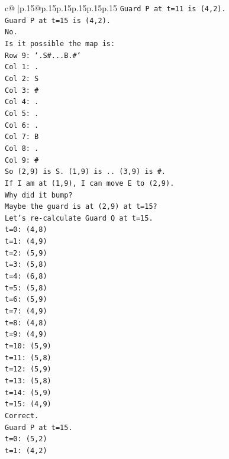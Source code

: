 \documentclass{article}
\begin{document}
{\begin{supertabular}{c@{$\;$}|p{.15\linewidth}@{}p{.15\linewidth}p{.15\linewidth}p{.15\linewidth}p{.15\linewidth}p{.15\linewidth}}
{{{\texttt{Guard P at t=11 is (4,2).} \\
\texttt{Guard P at t=15 is (4,2).} \\
\texttt{No.} \\
\texttt{Is it possible the map is:} \\
\texttt{Row 9: `.S\#...B.\#`} \\
\texttt{Col 1: .} \\
\texttt{Col 2: S} \\
\texttt{Col 3: \#} \\
\texttt{Col 4: .} \\
\texttt{Col 5: .} \\
\texttt{Col 6: .} \\
\texttt{Col 7: B} \\
\texttt{Col 8: .} \\
\texttt{Col 9: \#} \\
\texttt{So (2,9) is S. (1,9) is .. (3,9) is \#.} \\
\texttt{If I am at (1,9), I can move E to (2,9).} \\
\texttt{Why did it bump?} \\
\texttt{Maybe the guard is at (2,9) at t=15?} \\
\texttt{Let's re{-}calculate Guard Q at t=15.} \\
\texttt{t=0: (4,8)} \\
\texttt{t=1: (4,9)} \\
\texttt{t=2: (5,9)} \\
\texttt{t=3: (5,8)} \\
\texttt{t=4: (6,8)} \\
\texttt{t=5: (5,8)} \\
\texttt{t=6: (5,9)} \\
\texttt{t=7: (4,9)} \\
\texttt{t=8: (4,8)} \\
\texttt{t=9: (4,9)} \\
\texttt{t=10: (5,9)} \\
\texttt{t=11: (5,8)} \\
\texttt{t=12: (5,9)} \\
\texttt{t=13: (5,8)} \\
\texttt{t=14: (5,9)} \\
\texttt{t=15: (4,9)} \\
\texttt{Correct.} \\
\texttt{Guard P at t=15.} \\
\texttt{t=0: (5,2)} \\
\texttt{t=1: (4,2)} \\
}}}
\end{supertabular}}
\end{document}
